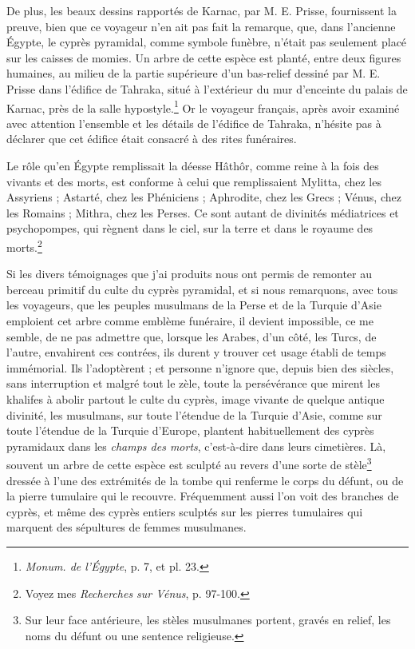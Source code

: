 \documentclass{article}
\begin{document}
De plus, les beaux dessins rapportés de Karnac, par M. E. Prisse, fournissent la preuve, bien que ce voyageur n'en ait pas fait la remarque, que, dans l'ancienne Égypte, le cyprès pyramidal, comme symbole funèbre, n'était pas seulement placé sur les caisses de momies. Un arbre de cette espèce est planté, entre deux figures humaines, au milieu de la partie supérieure d'un bas-relief dessiné par M. E. Prisse dans l'édifice de Tahraka, situé à l'extérieur du mur d'enceinte du palais de Karnac, près de la salle hypostyle.\footnote{\emph{Monum. de l'Égypte}, p. 7, et pl. 23.} Or le voyageur français, après avoir examiné avec attention l'ensemble et les détails de l'édifice de Tahraka, n'hésite pas à déclarer que cet édifice était consacré à des rites funéraires.

Le rôle qu'en Égypte remplissait la déesse Hâthôr, comme reine à la fois des vivants et des morts, est conforme à celui que remplissaient Mylitta, chez les Assyriens ; Astarté, chez les Phéniciens ; Aphrodite, chez les Grecs ; Vénus, chez les Romains ; Mithra, chez les Perses. Ce sont autant de divinités médiatrices et psychopompes, qui règnent dans le ciel, sur la terre et dans le royaume des morts.\footnote{Voyez mes \emph{Recherches sur Vénus}, p. 97-100.}

Si les divers témoignages que j'ai produits nous ont permis de remonter au berceau primitif du culte du cyprès pyramidal, et si nous remarquons, avec tous les voyageurs, que les peuples musulmans de la Perse et de la Turquie d'Asie emploient cet arbre comme emblème funéraire, il devient impossible, ce me semble, de ne pas admettre que, lorsque les Arabes, d'un côté, les Turcs, de l'autre, envahirent ces contrées, ils durent y trouver cet usage établi de temps immémorial. Ils l'adoptèrent ; et personne n'ignore que, depuis bien des siècles, sans interruption et malgré tout le zèle, toute la persévérance que mirent les khalifes à abolir partout le culte du cyprès, image vivante de quelque antique divinité, les musulmans, sur toute l'étendue de la Turquie d'Asie, comme sur toute l'étendue de la Turquie d'Europe, plantent habituellement des cyprès pyramidaux dans les \emph{champs des morts}, c'est-à-dire dans leurs cimetières. Là, souvent un arbre de cette espèce est sculpté au revers d'une sorte de stèle\footnote{Sur leur face antérieure, les stèles musulmanes portent, gravés en relief, les noms du défunt ou une sentence religieuse.} dressée à l'une des extrémités de la tombe qui renferme le corps du défunt, ou de la pierre tumulaire qui le recouvre. Fréquemment aussi l'on voit des branches de cyprès, et même des cyprès entiers sculptés sur les pierres tumulaires qui marquent des sépultures de femmes musulmanes.
\end{document}

